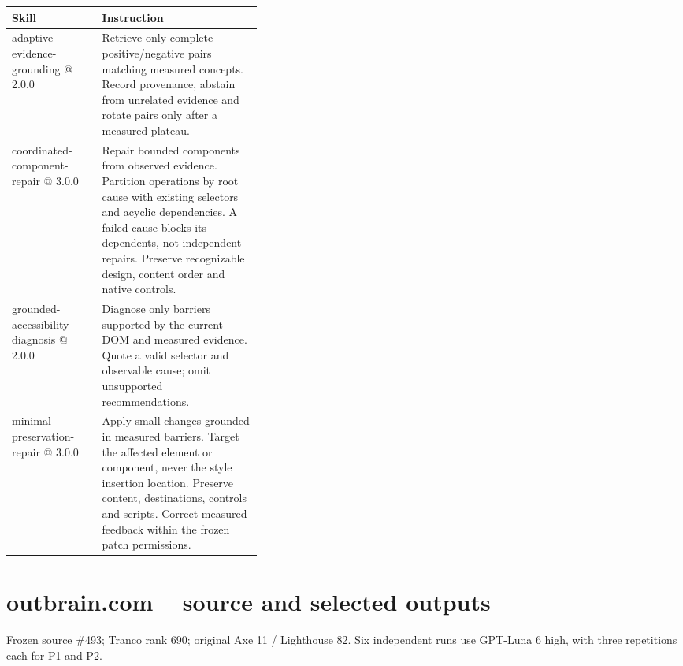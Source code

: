 \documentclass[acmsmall,screen,nonacm]{acmart}
\begin{document}
\begingroup\footnotesize\setlength{\tabcolsep}{3pt}\renewcommand{\arraystretch}{1.14}
\noindent\begin{tabular*}{\linewidth}{@{\extracolsep{\fill}}p{0.3651\linewidth}p{}@{}}\toprule
\raggedright\textbf{Skill} & \raggedright\textbf{Instruction}\tabularnewline\midrule
\raggedright adaptive-evidence-grounding @ 2.0.0 & \raggedright Retrieve only complete positive/negative pairs matching measured concepts. Record provenance, abstain from unrelated evidence and rotate pairs only after a measured plateau.\tabularnewline
\raggedright coordinated-component-repair @ 3.0.0 & \raggedright Repair bounded components from observed evidence. Partition operations by root cause with existing selectors and acyclic dependencies. A failed cause blocks its dependents, not independent repairs. Preserve recognizable design, content order and native controls.\tabularnewline
\raggedright grounded-accessibility-diagnosis @ 2.0.0 & \raggedright Diagnose only barriers supported by the current DOM and measured evidence. Quote a valid selector and observable cause; omit unsupported recommendations.\tabularnewline
\raggedright minimal-preservation-repair @ 3.0.0 & \raggedright Apply small changes grounded in measured barriers. Target the affected element or component, never the style insertion location. Preserve content, destinations, controls and scripts. Correct measured feedback within the frozen patch permissions.\tabularnewline
\bottomrule\end{tabular*}\endgroup\par\medskip

\clearpage
\section{outbrain.com -- source and selected outputs}

Frozen source \#493; Tranco rank 690; original Axe 11 / Lighthouse 82. Six independent runs use GPT-Luna 6 high, with three repetitions each for P1 and P2.
\end{document}
